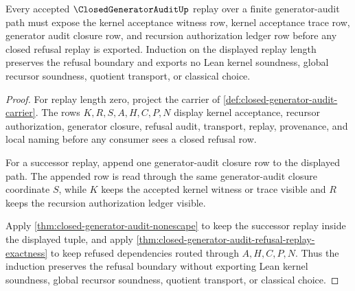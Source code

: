 \begin{theorem}
\label{thm:closed-generator-audit-kernel-replay-induction}
Every accepted $\ClosedGeneratorAuditUp$ replay over a finite generator-audit path must expose the kernel acceptance witness row, kernel acceptance trace row, generator audit closure row, and recursion authorization ledger row before any closed refusal replay is exported. Induction on the displayed replay length preserves the refusal boundary and exports no Lean kernel soundness, global recursor soundness, quotient transport, or classical choice.
\end{theorem}
\begin{proof}
For replay length zero, project the carrier of \autoref{def:closed-generator-audit-carrier}. The rows $K,R,S,A,H,C,P,N$ display kernel acceptance, recursor authorization, generator closure, refusal audit, transport, replay, provenance, and local naming before any consumer sees a closed refusal row.

For a successor replay, append one generator-audit closure row to the displayed path. The appended row is read through the same generator-audit closure coordinate $S$, while $K$ keeps the accepted kernel witness or trace visible and $R$ keeps the recursion authorization ledger visible.

Apply \autoref{thm:closed-generator-audit-nonescape} to keep the successor replay inside the displayed tuple, and apply \autoref{thm:closed-generator-audit-refusal-replay-exactness} to keep refused dependencies routed through $A,H,C,P,N$. Thus the induction preserves the refusal boundary without exporting Lean kernel soundness, global recursor soundness, quotient transport, or classical choice.
\end{proof}


